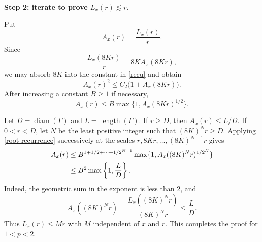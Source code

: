 \documentclass[11pt]{article}
\numberwithin{equation}{section}
\theoremstyle{remark}
\newcommand{\diam}{\operatorname{diam}}
\begin{document}
\textbf{Step 2: iterate to prove $L_x(r)\lesssim r$.}

Put
\[
  A_x(r)=\frac{L_x(r)}{r}.
\]
Since
\[
  \frac{L_x(8K r)}{r}=8K A_x(8K r),
\]
we may absorb $8K$ into the constant in \eqref{recu} and obtain
\begin{equation}
  A_x(r)^2\le C_2\bigl(1+A_x(8K r)\bigr).
\end{equation}
After increasing a constant $B\ge1$ if necessary,
\begin{equation}\label{root-recurrence}
  A_x(r)\le B\max\{1,A_x(8K r)^{1/2}\}.
\end{equation}

Let $D=\diam(\Gamma)$ and $L=\operatorname{length}(\Gamma)$.
If $r\ge D$, then $A_x(r)\le L/D$.  If $0<r<D$, let $N$ be the least
positive integer such that $(8K)^Nr\ge D$.  Applying
\eqref{root-recurrence} successively at the scales
$r,8Kr,\ldots,(8K)^{N-1}r$ gives
\begin{align}
  A_x(r)
  &\le B^{1+1/2+\cdots+1/2^{N-1}}
  \max\{1,A_x((8K)^Nr)^{1/2^N}\}\notag\\
  &\le B^2\max\left\{1,\frac{L}{D}\right\}.
\end{align}
Indeed, the geometric sum in the exponent is less than $2$, and
\[
  A_x((8K)^Nr)
  =\frac{L_x((8K)^Nr)}{(8K)^Nr}
  \le\frac{L}{D}.
\]
Thus $L_x(r)\le Mr$ with $M$ independent of $x$ and $r$.  This
completes the proof for $1<p<2$.


 
\end{document}
